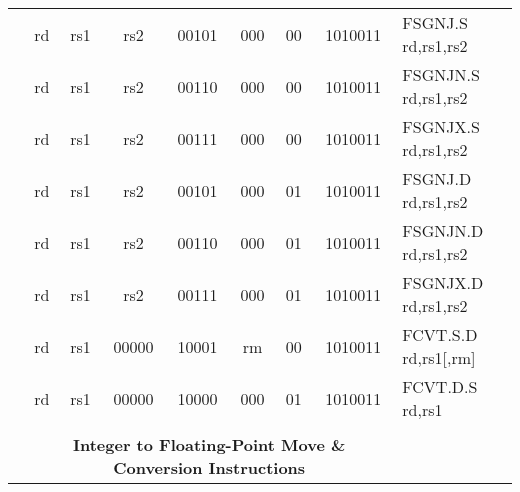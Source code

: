 \begin{table}[p]
\begin{small}
\begin{center}
\begin{tabular}{rccccccccccl}
&
\multicolumn{1}{|c|}{rd} &
\multicolumn{1}{c|}{rs1} &
\multicolumn{1}{c|}{rs2} &
\multicolumn{3}{c|}{00101} &
\multicolumn{2}{c|}{000} &
\multicolumn{1}{c|}{00} &
\multicolumn{1}{c|}{1010011} & FSGNJ.S rd,rs1,rs2 \\
\cline{2-11}
  

&
\multicolumn{1}{|c|}{rd} &
\multicolumn{1}{c|}{rs1} &
\multicolumn{1}{c|}{rs2} &
\multicolumn{3}{c|}{00110} &
\multicolumn{2}{c|}{000} &
\multicolumn{1}{c|}{00} &
\multicolumn{1}{c|}{1010011} & FSGNJN.S rd,rs1,rs2 \\
\cline{2-11}
  

&
\multicolumn{1}{|c|}{rd} &
\multicolumn{1}{c|}{rs1} &
\multicolumn{1}{c|}{rs2} &
\multicolumn{3}{c|}{00111} &
\multicolumn{2}{c|}{000} &
\multicolumn{1}{c|}{00} &
\multicolumn{1}{c|}{1010011} & FSGNJX.S rd,rs1,rs2 \\
\cline{2-11}
  

&
\multicolumn{1}{|c|}{rd} &
\multicolumn{1}{c|}{rs1} &
\multicolumn{1}{c|}{rs2} &
\multicolumn{3}{c|}{00101} &
\multicolumn{2}{c|}{000} &
\multicolumn{1}{c|}{01} &
\multicolumn{1}{c|}{1010011} & FSGNJ.D rd,rs1,rs2 \\
\cline{2-11}
  

&
\multicolumn{1}{|c|}{rd} &
\multicolumn{1}{c|}{rs1} &
\multicolumn{1}{c|}{rs2} &
\multicolumn{3}{c|}{00110} &
\multicolumn{2}{c|}{000} &
\multicolumn{1}{c|}{01} &
\multicolumn{1}{c|}{1010011} & FSGNJN.D rd,rs1,rs2 \\
\cline{2-11}
  

&
\multicolumn{1}{|c|}{rd} &
\multicolumn{1}{c|}{rs1} &
\multicolumn{1}{c|}{rs2} &
\multicolumn{3}{c|}{00111} &
\multicolumn{2}{c|}{000} &
\multicolumn{1}{c|}{01} &
\multicolumn{1}{c|}{1010011} & FSGNJX.D rd,rs1,rs2 \\
\cline{2-11}
  

&
\multicolumn{1}{|c|}{rd} &
\multicolumn{1}{c|}{rs1} &
\multicolumn{1}{c|}{00000} &
\multicolumn{3}{c|}{10001} &
\multicolumn{2}{c|}{rm} &
\multicolumn{1}{c|}{00} &
\multicolumn{1}{c|}{1010011} & FCVT.S.D rd,rs1[,rm] \\
\cline{2-11}
  

&
\multicolumn{1}{|c|}{rd} &
\multicolumn{1}{c|}{rs1} &
\multicolumn{1}{c|}{00000} &
\multicolumn{3}{c|}{10000} &
\multicolumn{2}{c|}{000} &
\multicolumn{1}{c|}{01} &
\multicolumn{1}{c|}{1010011} & FCVT.D.S rd,rs1 \\
\cline{2-11}
  

&
\multicolumn{10}{c}{} & \\
&
\multicolumn{10}{c}{\bf Integer to Floating-Point Move \& Conversion Instructions} & \\
\cline{2-11}
  


\end{tabular}
\end{center}
\end{small}
\end{table}
